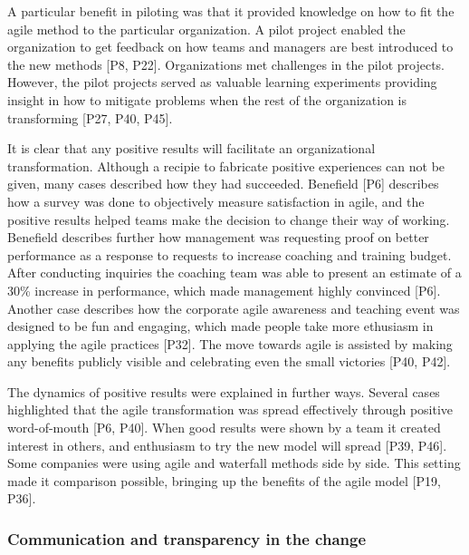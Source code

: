 \documentclass[preprint,authoryear,12pt]{elsarticle}
\begin{document}

A particular benefit in piloting was that it provided knowledge on how to fit
the agile method to the particular organization.
A pilot project enabled the organization to get feedback on how teams and
managers are best introduced to the new methods [P8, P22].
Organizations met challenges in the pilot projects. However, the pilot projects
served as valuable learning experiments providing insight in how to mitigate
problems when the rest of the organization is transforming [P27, P40, P45].


It is clear that any positive results will facilitate an organizational
transformation. Although a recipie to fabricate positive experiences can not be
given, many cases described how they had succeeded. Benefield [P6] describes how
a survey was done to objectively measure satisfaction in agile, and the positive
results helped teams make the decision to change their way of working. Benefield
describes further how management was requesting proof on better performance as a
response to requests to increase coaching and training budget. After conducting
inquiries the coaching team was able to present an estimate of a 30\% increase
in performance, which made management highly convinced [P6]. Another case
describes how the corporate agile awareness and teaching event was designed to
be fun and engaging, which made people take more ethusiasm in applying the agile
practices [P32]. The move towards agile is assisted by making any benefits
publicly visible and celebrating even the small victories [P40, P42].

The dynamics of positive results were explained in further ways. Several cases
highlighted that the agile transformation was spread effectively through
positive word-of-mouth [P6, P40]. When good results were shown by a team it
created interest in others, and enthusiasm to try the new model will spread
[P39, P46]. Some companies were using agile and waterfall methods side by side.
This setting made it comparison possible, bringing up the benefits of the agile
model [P19, P36].


\subsubsection{Communication and transparency in the change}
\end{document}
